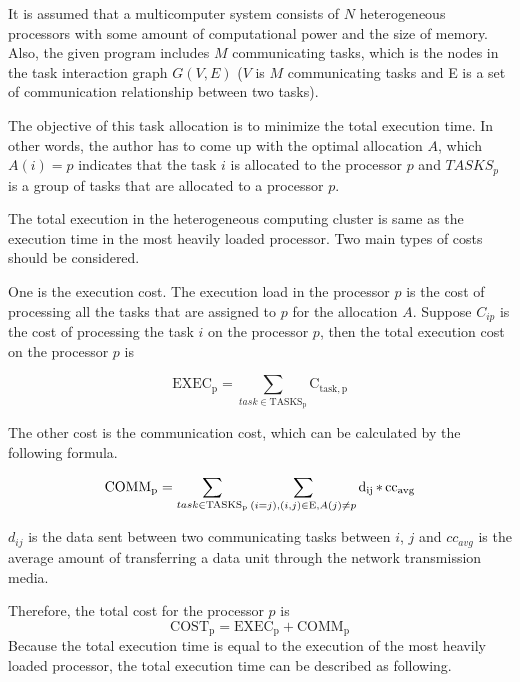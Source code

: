 It is assumed that a multicomputer system consists of $N$ heterogeneous processors with some amount of computational power and the size of memory.  Also, the given program includes $M$ communicating tasks, which is the nodes in the task interaction graph $G(V, E)$ ($V$ is $M$ communicating tasks and E is a set of communication relationship between two tasks).

The objective of this task allocation is to minimize the total execution time. In other words, the author has to come up with the optimal allocation $A$, which $A(i) = p$ indicates that the task $i$ is allocated to the processor $p$ and $TASKS_p$ is a group of tasks that are allocated to a processor $p$.

 The total execution in the heterogeneous computing cluster is same as the execution time in the most heavily loaded processor.  Two main types of costs should be considered.
 
 One is the execution cost.  The execution load in the processor $p$ is the cost of processing all the tasks that are assigned to $p$ for the allocation $A$. Suppose $C_{ip}$ is the cost of processing the task $i$ on the processor $p$, then the total execution cost on the processor $p$ is 
 
 \begin{equation}
\operatorname{EXEC_p } = \sum_{task \in  \operatorname{TASKS_p}} \operatorname{C_{task, p}}
 \end{equation}
 
  The other cost is the communication cost, which can be calculated by the following formula.

\begin{equation}  
\operatorname{COMM_p} = \sum_{task \in \operatorname{TASKS_p}} \sum_{(i=j), \\(i, j) \in \operatorname{E} , \\ A(j) \neq p} \operatorname{d_{ij}} * \operatorname{cc_{avg}}
\end{equation}

$d_{ij}$ is the data sent between two communicating tasks between $i$, $j$ and $cc_{avg}$ is the average amount of transferring a data unit through the network transmission media.
  
 Therefore, the total cost for the processor $p$ is 
 \begin{equation}
\operatorname{COST_p} = \operatorname{EXEC_p} + \operatorname{COMM_p}
 \end{equation}
 Because the total execution time is equal to the execution of the most heavily loaded processor, the total execution time can be described as following.
 
